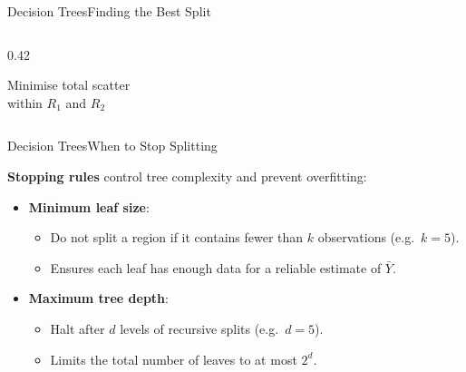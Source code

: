 \documentclass[hyperref={pdfpagelabels=false}]{beamer}
\begin{document}
\begin{frame}{Decision Trees}{Finding the Best Split}
\begin{columns}[T]
\begin{column}{0.42\textwidth}
\begin{center}
\vspace{0.2cm}
{\scriptsize Minimise total scatter\\[2pt] within $R_1$ and $R_2$}
\end{center}
\end{column}

\end{columns}
\end{frame}





\begin{frame}{Decision Trees}{When to Stop Splitting}

\textbf{Stopping rules} control tree complexity and prevent overfitting:
\vspace{0.3cm}
\begin{itemize}
  \item \textbf{Minimum leaf size}: 
  \begin{itemize}
    \vspace{0.2cm}
\item  Do not split a region if it contains fewer than $k$ observations (e.g.\ $k = 5$). 
     \vspace{0.05cm}
    \item  Ensures each leaf has enough data for a reliable estimate of $\bar{Y}$.
  \end{itemize}
  \vspace{0.2cm}
  \item \textbf{Maximum tree depth}:
  \begin{itemize}
    \vspace{0.2cm}

    \item Halt after $d$ levels of recursive splits (e.g.\ $d = 5$). 
      \vspace{0.2cm}

    \item Limits the total number of leaves to at most $2^d$.
  \end{itemize}
\end{itemize}

\end{frame}
\end{document}
